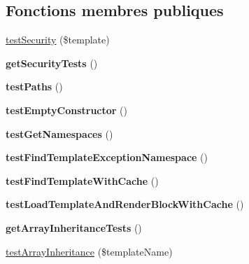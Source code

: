 \subsection*{Fonctions membres publiques}
\begin{DoxyCompactItemize}
\item 
\hyperlink{class_twig___tests___loader___filesystem_test_a06c8be227f86374f1b3c9f95491b524c}{test\+Security} (\$template)
\item 
{\bfseries get\+Security\+Tests} ()\hypertarget{class_twig___tests___loader___filesystem_test_ae541ed78b5d2c801df749f4d4420da48}{}\label{class_twig___tests___loader___filesystem_test_ae541ed78b5d2c801df749f4d4420da48}

\item 
{\bfseries test\+Paths} ()\hypertarget{class_twig___tests___loader___filesystem_test_ae6896e9e9292e1e0e5c03d290f245d16}{}\label{class_twig___tests___loader___filesystem_test_ae6896e9e9292e1e0e5c03d290f245d16}

\item 
{\bfseries test\+Empty\+Constructor} ()\hypertarget{class_twig___tests___loader___filesystem_test_aca5073988655e0ff9d9b7d3abc4654aa}{}\label{class_twig___tests___loader___filesystem_test_aca5073988655e0ff9d9b7d3abc4654aa}

\item 
{\bfseries test\+Get\+Namespaces} ()\hypertarget{class_twig___tests___loader___filesystem_test_a4a05e4ef3fe397f07ffa54c180eaa446}{}\label{class_twig___tests___loader___filesystem_test_a4a05e4ef3fe397f07ffa54c180eaa446}

\item 
{\bfseries test\+Find\+Template\+Exception\+Namespace} ()\hypertarget{class_twig___tests___loader___filesystem_test_a42f886f4259adb76b6f08f1b90fe0879}{}\label{class_twig___tests___loader___filesystem_test_a42f886f4259adb76b6f08f1b90fe0879}

\item 
{\bfseries test\+Find\+Template\+With\+Cache} ()\hypertarget{class_twig___tests___loader___filesystem_test_af097ced79e72daffbaca58c2a8870ca6}{}\label{class_twig___tests___loader___filesystem_test_af097ced79e72daffbaca58c2a8870ca6}

\item 
{\bfseries test\+Load\+Template\+And\+Render\+Block\+With\+Cache} ()\hypertarget{class_twig___tests___loader___filesystem_test_a7d531ee60e3db0ad11595b832f3e0393}{}\label{class_twig___tests___loader___filesystem_test_a7d531ee60e3db0ad11595b832f3e0393}

\item 
{\bfseries get\+Array\+Inheritance\+Tests} ()\hypertarget{class_twig___tests___loader___filesystem_test_a408f855d02b33aa0fb9c48f69bdb4b46}{}\label{class_twig___tests___loader___filesystem_test_a408f855d02b33aa0fb9c48f69bdb4b46}

\item 
\hyperlink{class_twig___tests___loader___filesystem_test_a0c5fbde437b4eed45a85d523bad11452}{test\+Array\+Inheritance} (\$template\+Name)
\end{DoxyCompactItemize}


